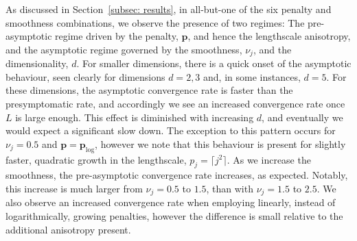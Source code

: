 \documentclass[pdflatex,sn-mathphys-num]{sn-jnl}%
\theoremstyle{thmstyleone}%
\theoremstyle{thmstyletwo}%
\theoremstyle{thmstylethree}%
\begin{document}
As discussed in Section~\ref{subsec: results}, in all-but-one of the six penalty and smoothness combinations, we observe the presence of two regimes: The pre-asymptotic regime driven by the penalty, \(\mathbf{p}\), and hence the lengthscale anisotropy, and the asymptotic regime governed by the smoothness, \(\nu_j\), and the dimensionality, \(d\). For smaller dimensions, there is a quick onset of the asymptotic behaviour, seen clearly for dimensions \(d=2,3\) and, in some instances, \(d=5\). For these dimensions, the asymptotic convergence rate is faster than the presymptomatic rate, and accordingly we see an increased convergence rate once \(L\) is large enough. This effect is diminished with increasing \(d\), and eventually we would expect a significant slow down. The exception to this pattern occurs for \(\nu_j=0.5\) and \(\mathbf{p}=\mathbf{p}_{\log}\), however we note that this behaviour is present for slightly faster, quadratic growth in the lengthscale, \(p_j=\lceil j^2\rceil\). As we increase the smoothness, the pre-asymptotic convergence rate increases, as expected. Notably, this increase is much larger from \(\nu_j =0.5\) to \(1.5\), than with \(\nu_j=1.5\) to \(2.5\). We also observe an increased convergence rate when employing linearly, instead of logarithmically, growing penalties, however the difference is small relative to the additional anisotropy present. 
\end{document}
